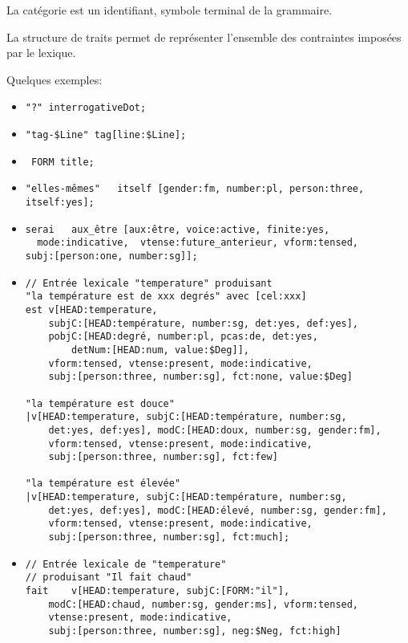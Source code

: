 \documentclass[11pt]{article}
\begin{document}
La catégorie est un identifiant, symbole terminal de la grammaire.

La structure de traits permet de représenter l'ensemble des
contraintes imposées par le lexique.

Quelques exemples:

\begin{itemize}
\item \verb#"?" interrogativeDot;#

\bigskip
\item \verb#"tag-$Line" tag[line:$Line]; #

\bigskip
\item \verb# FORM title; #

\bigskip
\item \verb#"elles-mêmes"	itself [gender:fm, number:pl, person:three, itself:yes]; #

\bigskip
\item \begin{verbatim}
serai	aux_être [aux:être, voice:active, finite:yes,
  mode:indicative,  vtense:future_anterieur, vform:tensed, 
subj:[person:one, number:sg]]; 
\end{verbatim}

\bigskip
\item \begin{verbatim}
// Entrée lexicale "temperature" produisant 
"la température est de xxx degrés" avec [cel:xxx]
est v[HEAD:temperature, 
	subjC:[HEAD:température, number:sg, det:yes, def:yes], 
	pobjC:[HEAD:degré, number:pl, pcas:de, det:yes,
		detNum:[HEAD:num, value:$Deg]], 
	vform:tensed, vtense:present, mode:indicative, 
	subj:[person:three, number:sg], fct:none, value:$Deg]

"la température est douce"
|v[HEAD:temperature, subjC:[HEAD:température, number:sg, 
	det:yes, def:yes], modC:[HEAD:doux, number:sg, gender:fm],
	vform:tensed, vtense:present, mode:indicative, 
	subj:[person:three, number:sg], fct:few]

"la température est élevée"
|v[HEAD:temperature, subjC:[HEAD:température, number:sg, 
	det:yes, def:yes], modC:[HEAD:élevé, number:sg, gender:fm],
	vform:tensed, vtense:present, mode:indicative, 
	subj:[person:three, number:sg], fct:much];
\end{verbatim}

\bigskip
\item \begin{verbatim}
// Entrée lexicale de "temperature"
// produisant "Il fait chaud"
fait	v[HEAD:temperature, subjC:[FORM:"il"], 
	modC:[HEAD:chaud, number:sg, gender:ms], vform:tensed,
	vtense:present, mode:indicative, 
	subj:[person:three, number:sg], neg:$Neg, fct:high]


\end{verbatim}
\end{itemize}
\end{document}
